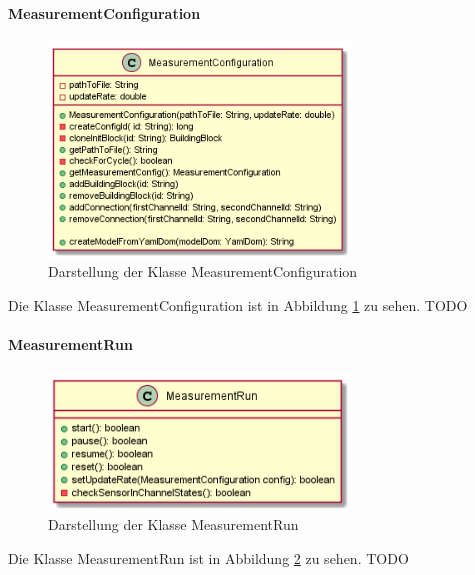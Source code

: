 \documentclass[parskip=full]{scrartcl}
\begin{document}
\paragraph{MeasurementConfiguration}
\begin{figure}[htbp]
	\begin{center}
		\includegraphics[width = 8cm]{Grafiken/MeasurementConfiguration.png}
		\caption{Darstellung der Klasse MeasurementConfiguration}
		\label{MeasurementConfiguration}
	\end{center}
\end{figure}
Die Klasse MeasurementConfiguration ist in Abbildung \ref{MeasurementConfiguration} zu sehen.
TODO

\paragraph{MeasurementRun}
\begin{figure}[htbp]
	\begin{center}
		\includegraphics[width = 8cm]{Grafiken/MeasurementRun.png}
		\caption{Darstellung der Klasse MeasurementRun}
		\label{MeasurementRun}
	\end{center}
\end{figure}
Die Klasse MeasurementRun ist in Abbildung \ref{MeasurementRun} zu sehen.
TODO
\end{document}
